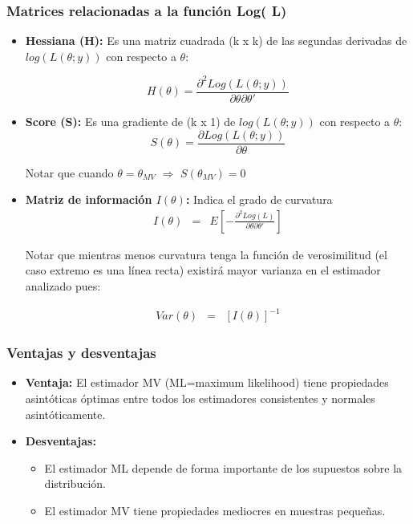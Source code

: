 \begin{frame}
	\frametitle{Matrices relacionadas a la función Log( L)}
	\begin{itemize}
		\item \textbf{Hessiana (H):} Es una matriz cuadrada (k x k) de
		las segundas derivadas de $log(L(\theta;y))$ con respecto a
		$\theta$: 
		
		$$H(\theta)=\frac{\partial ^2 Log(L(\theta;y))}{\partial \theta \partial \theta'}$$
		
		\item \textbf{Score (S):} Es una gradiente de (k x 1) de $log(L(\theta;y))$ con respecto a $\theta$: 
		$$S(\theta)=\frac{\partial Log(L(\theta;y))}{\partial \theta}$$
		
		Notar que cuando $\theta=\theta_{MV}$ $\Longrightarrow$ $S(\theta_{MV})=0$
	\end{itemize}
\end{frame}

\begin{frame}
	\begin{itemize}
		\item \textbf{Matriz de información $I(\theta)$:} Indica el
		grado de curvatura
		\begin{eqnarray*}
			I(\theta) &=& E[-\frac{\partial^2 Log(L)}{\partial \theta \partial
				\theta'}]
		\end{eqnarray*}
		
		Notar que mientras menos curvatura tenga la función de
		verosimilitud (el caso extremo es una línea recta) existirá
		mayor varianza en el estimador analizado pues:
		
		\begin{eqnarray*}
			Var(\theta)&=&[I(\theta)]^{-1}
		\end{eqnarray*}
		
	\end{itemize}
\end{frame}


\begin{frame}
	\frametitle{Ventajas y desventajas}
	\begin{itemize}
		\item \textbf{Ventaja:} El estimador MV (ML=maximum likelihood) tiene
		propiedades asintóticas óptimas entre todos los estimadores
		consistentes y normales asintóticamente.
		\item \textbf{Desventajas:}
		\begin{itemize}
			\item El estimador
			ML depende de forma importante de los supuestos sobre la
			distribución.
			\item El estimador MV tiene propiedades mediocres en
			muestras pequeñas.
		\end{itemize}
	\end{itemize}
\end{frame}

